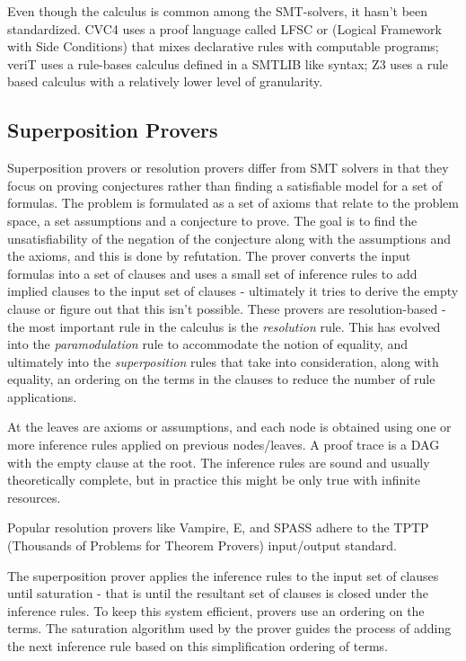 \documentclass{article}
\begin{document}
	Even though the calculus is common among the SMT-solvers, 
	it hasn't been standardized. CVC4 uses a proof language called
	LFSC or (Logical Framework with Side Conditions) that mixes 
	declarative rules with computable programs; veriT uses a rule-bases 
	calculus defined in a SMTLIB like syntax; Z3 uses a rule based 
	calculus with a relatively lower level of granularity. 
	
	\subsection{Superposition Provers}
	\label{sup}
	Superposition provers or resolution provers differ 
	from SMT solvers in that they focus on proving 
	conjectures rather than finding a satisfiable model
	for a set of formulas. The problem is formulated 
	as a set of axioms that relate to the problem space, 
	a set assumptions and a conjecture to prove. 
	The goal is to find the unsatisfiability of 
	the negation of the conjecture along with the 
	assumptions and the axioms, and this is done 
	by refutation. The prover converts 
	the input formulas into a set of clauses and 
	uses a small set of inference rules to add 
	implied clauses to the input set of 
	clauses - ultimately it tries to derive 
	the empty clause or figure out that this 
	isn't possible. These provers are resolution-based -
	the most important rule in the calculus is the 
	\textit{resolution} rule. This has evolved into 
	the \textit{paramodulation} rule to accommodate 
	the notion of equality, and ultimately into 
	the \textit{superposition} rules that take into 
	consideration, along with equality, an ordering 
	on the terms in the clauses to reduce the number 
	of rule applications.
	
	At the leaves are axioms or assumptions, and 
	each node is obtained using one or more inference
	rules applied on previous nodes/leaves. 
	A proof trace is a DAG with the empty clause at
	the root. The inference rules are sound and 
	usually theoretically complete, but in practice 
	this might be only true with infinite resources.
	
	Popular resolution provers like Vampire, E, and 
	SPASS adhere to the TPTP (Thousands of Problems 
	for Theorem Provers) input/output standard.
	
	The superposition prover applies the inference 
	rules to the input set of 
	clauses until saturation - that is until the 
	resultant set of clauses is closed under the 
	inference rules. To keep this system
	efficient, provers use an ordering 
	on the terms. The saturation algorithm used 
	by the prover guides the process of adding the 
	next inference rule based on this simplification 
	ordering of terms.
	
\end{document}
